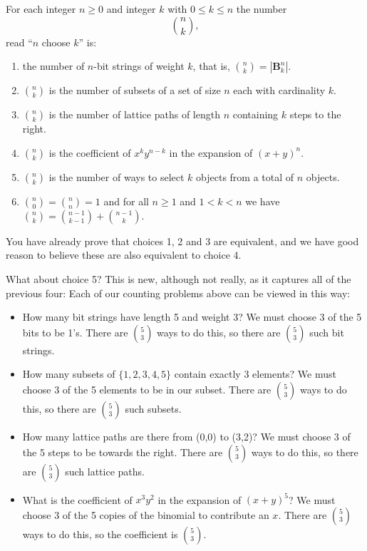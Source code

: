 \documentclass[10pt,]{book}
\theoremstyle{plain}
\theoremstyle{definition}
\theoremstyle{definition}
\theoremstyle{definition}
\numberwithin{equation}{chapter}
\def\B{\mathbf{B}}
\newcommand{\lt}{<}
\begin{document}
\begin{assemblage}\label{assemblage-1}
\hypertarget{p-526}{}%
 For each integer \(n \ge 0\) and integer \(k\) with \(0 \le k \le n\) the number%
\begin{equation*}
{n\choose k},
\end{equation*}
read ``\(n\) choose \(k\)'' is: \leavevmode%
\begin{enumerate}
\item\hypertarget{li-36}{}the number of \(n\)-bit strings of weight \(k\), that is, \({n\choose k} = |\B^n_k|\).%
\item\hypertarget{li-37}{}\({n \choose k}\) is the number of subsets of a set of size \(n\) each with cardinality \(k\).%
\item\hypertarget{li-38}{}\({n \choose k}\) is the number of lattice paths of length \(n\) containing \(k\) steps to the right.%
\item\hypertarget{li-39}{}\({n \choose k}\) is the coefficient of \(x^ky^{n-k}\) in the expansion of \((x+y)^n\).%
\item\hypertarget{li-40}{}\({n \choose k}\) is the number of ways to select \(k\) objects from a total of \(n\) objects.%
\item\hypertarget{li-41}{}\hypertarget{p-527}{}%
\(\binom{n}{0} = \binom{n}{n} = 1\) and for all \(n \ge 1\) and \(1 \lt k \lt n\) we have \(\binom{n}{k} = \binom{n-1}{k-1} + \binom{n-1}{k}\).%
\end{enumerate}
%
\end{assemblage}
\hypertarget{p-528}{}%
You have already prove that choices 1, 2 and 3 are equivalent, and we have good reason to believe these are also equivalent to choice 4.%
\par
\hypertarget{p-529}{}%
What about choice 5?  This is new, although not really, as it captures all of the previous four: Each of our counting problems above can be viewed in this way: \leavevmode%
\begin{itemize}[label=\textbullet]
\item{}\hypertarget{p-530}{}%
How many bit strings have length 5 and weight 3?  We must choose \(3\) of the 5 bits to be 1's.  There are \({5 \choose 3}\) ways to do this, so there are \({5 \choose 3}\) such bit strings.%
\item{}\hypertarget{p-531}{}%
How many subsets of \(\{1,2,3,4,5\}\) contain exactly 3 elements?  We must choose \(3\) of the 5 elements to be in our subset.  There are \({5 \choose 3}\) ways to do this, so there are \({5 \choose 3}\) such subsets.%
\item{}\hypertarget{p-532}{}%
How many lattice paths are there from (0,0) to (3,2)?  We must choose 3 of the 5 steps to be towards the right.  There are \({5 \choose 3}\) ways to do this, so there are \({5 \choose 3}\) such lattice paths.%
\item{}\hypertarget{p-533}{}%
What is the coefficient of \(x^3y^2\) in the expansion of \((x+y)^5\)?  We must choose 3 of the 5 copies of the binomial to contribute an \(x\).  There are \({5 \choose 3}\) ways to do this, so the coefficient is \({5 \choose 3}\).%
\end{itemize}
\end{document}
